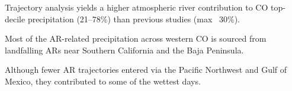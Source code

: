 \documentclass[draft]{agujournal2019}
\begin{document}






\begin{keypoints}
\item Trajectory analysis yields a higher atmospheric river contribution to CO top-decile precipitation (21–78\%) than previous studies (max ~30\%).
\item Most of the AR-related precipitation across western CO is sourced from landfalling ARs near Southern California and the Baja Peninsula.
\item Although fewer AR trajectories entered via the Pacific Northwest and Gulf of Mexico, they contributed to some of the wettest days.
\end{keypoints}

%
%

%
%
\end{document}
